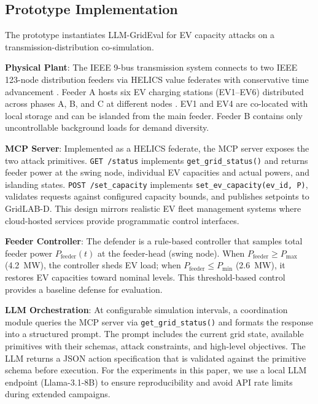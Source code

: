\subsection{Prototype Implementation}
The prototype instantiates LLM-GridEval for EV capacity attacks on a transmission-distribution co-simulation.

\textbf{Physical Plant}: The IEEE 9-bus transmission system connects to two IEEE 123-node distribution feeders via HELICS value federates with conservative time advancement \cite{hardy2024helics}. Feeder A hosts six EV charging stations (EV1--EV6) distributed across phases A, B, and C at different nodes \cite{ieee123feeder}. EV1 and EV4 are co-located with local storage and can be islanded from the main feeder. Feeder B contains only uncontrollable background loads for demand diversity.

\textbf{MCP Server}: Implemented as a HELICS federate, the MCP server exposes the two attack primitives. \texttt{GET /status} implements \texttt{get\_grid\_status()} and returns feeder power at the swing node, individual EV capacities and actual powers, and islanding states. \texttt{POST /set\_capacity} implements \texttt{set\_ev\_capacity(ev\_id, P)}, validates requests against configured capacity bounds, and publishes setpoints to GridLAB-D. This design mirrors realistic EV fleet management systems where cloud-hosted services provide programmatic control interfaces.

\textbf{Feeder Controller}: The defender is a rule-based controller that samples total feeder power $P_{\text{feeder}}(t)$ at the feeder-head (swing node). When $P_{\text{feeder}} \geq P_{\max}$ (4.2~MW), the controller sheds EV load; when $P_{\text{feeder}} \leq P_{\min}$ (2.6~MW), it restores EV capacities toward nominal levels. This threshold-based control provides a baseline defense for evaluation.

\textbf{LLM Orchestration}: At configurable simulation intervals, a coordination module queries the MCP server via \texttt{get\_grid\_status()} and formats the response into a structured prompt. The prompt includes the current grid state, available primitives with their schemas, attack constraints, and high-level objectives. The LLM returns a JSON action specification that is validated against the primitive schema before execution. For the experiments in this paper, we use a local LLM endpoint (Llama-3.1-8B) to ensure reproducibility and avoid API rate limits during extended campaigns.
